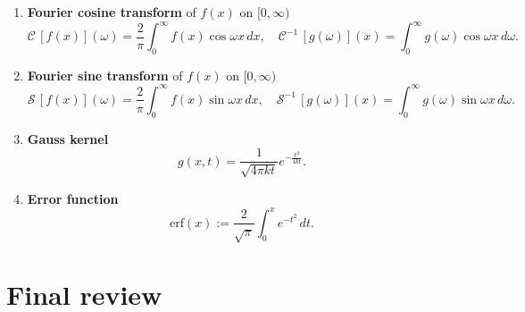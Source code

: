 \begin{enumerate}
\item \textbf{Fourier cosine transform} of $f (x)$ on $[0,\infty)$
\[\mathcal{C}\,[f(x)](\omega)=\frac{2}{\pi} \int_{0}^{\infty}f(x)\cos\omega x \, dx, \quad \mathcal{C}^{-1}\,[g(\omega)](x)= \int_{0}^{\infty}g(\omega)\cos\omega x \, d\omega.\]

\item \textbf{Fourier sine transform} of $f (x)$ on $[0,\infty)$
\[\mathcal{S}\,[f(x)](\omega)=\frac{2}{\pi} \int_{0}^{\infty}f(x)\sin\omega x \, dx, \quad \mathcal{S}^{-1}\,[g(\omega)](x)= \int_{0}^{\infty}g(\omega)\sin\omega x \, d\omega.\]

\item \textbf{Gauss kernel}
\[g(x,t) = \frac{1}{\sqrt{4\pi k t}}e^{-\frac{x^{2}}{4 k t}}.\]

\item \textbf{Error function}
\[\text{erf}(x):= \frac{2}{\sqrt{\pi}}\int_{0}^{x}e^{-t^{2}}\,dt.\]

\end{enumerate}

\newpage

\section{Final review}

